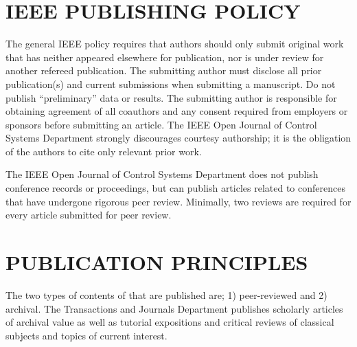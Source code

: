 \documentclass{IEEEojcsys}
\begin{document}
\section{IEEE PUBLISHING POLICY}

The general IEEE policy requires that authors should only submit original work that has neither appeared elsewhere for publication, nor is under review for another refereed publication. The submitting author must disclose all prior publication(s) and current submissions when submitting a manuscript. Do not publish ``preliminary'' data or results. The submitting author is responsible for obtaining agreement of all coauthors and any consent required from employers or sponsors before submitting an article. The IEEE Open Journal of Control Systems Department strongly discourages courtesy authorship; it is the obligation of the authors to cite only relevant prior work.

The IEEE Open Journal of Control Systems Department does not publish conference records or proceedings, but can publish articles related to conferences that have undergone rigorous peer review. Minimally, two reviews are required for every article submitted for peer review.

\section{PUBLICATION PRINCIPLES}

The two types of contents of that are published are; 1) peer-reviewed and 2) archival. The Transactions and Journals Department publishes scholarly articles of archival value as well as tutorial expositions and critical reviews of classical subjects and topics of current interest. 
\end{document}
